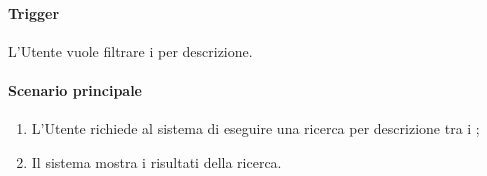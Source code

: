 \paragraph*{Trigger}
L'Utente vuole filtrare i  per descrizione.

\paragraph*{Scenario principale}
\begin{enumerate}
  \item L'Utente richiede al sistema di eseguire una ricerca per descrizione tra i ;
  \item Il sistema mostra i risultati della ricerca.
\end{enumerate}
